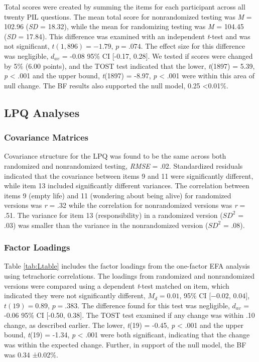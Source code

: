 \documentclass[english,man, mask]{apa6}
\theoremstyle{definition}
\theoremstyle{definition}
\theoremstyle{definition}
\theoremstyle{remark}
\begin{document}
Total scores were created by summing the items for each participant
across all twenty PIL questions. The mean total score for nonrandomized
testing was \emph{M} = 102.96 (\emph{SD} = 18.32), while the mean for
randomizing testing was \emph{M} = 104.45 (\emph{SD} = 17.84). This
difference was examined with an independent \emph{t}-test and was not
significant, \(t(1,896) = -1.79\), \(p = .074\). The effect size for
this difference was negligible, \(d_{av}\) = -0.08 95\% CI {[}-0.17,
0.28{]}. We tested if scores were changed by 5\% (6.00 points), and the
TOST test indicated that the lower, \emph{t}(1897) = 5.39, \emph{p}
\textless{} .001 and the upper bound, \emph{t}(1897) = -8.97, \emph{p}
\textless{} .001 were within this area of null change. The BF results
also supported the null model, 0.25 \textless{}0.01\%.

\subsection{LPQ Analyses}\label{lpq-analyses}

\subsubsection{Covariance Matrices}\label{covariance-matrices-1}

Covariance structure for the LPQ was found to be the same across both
randomized and nonrandomized testing, \emph{RMSE} = .02. Standardized
residuals indicated that the covariance between items 9 and 11 were
significantly different, while item 13 included significantly different
variances. The correlation between items 9 (empty life) and 11
(wondering about being alive) for randomized versions was \emph{r} = .32
while the correlation for nonrandomized versions was \emph{r} = .51. The
variance for item 13 (responsibility) in a randomized version (\(SD^2\)
= .03) was smaller than the variance in the nonrandomized version
(\(SD^2\) = .08).

\subsubsection{Factor Loadings}\label{factor-loadings-1}

Table \ref{tab:Ltable} includes the factor loadings from the one-factor
EFA analysis using tetrachoric correlations. The loadings from
randomized and nonrandomized versions were compared using a dependent
\emph{t}-test matched on item, which indicated they were not
significantly different, \(M_d = 0.01\), 95\% CI \([-0.02\), \(0.04]\),
\(t(19) = 0.89\), \(p = .383\). The difference found for this test was
negligible, \(d_{av}\) = -0.06 95\% CI {[}-0.50, 0.38{]}. The TOST test
examined if any change was within .10 change, as described earlier. The
lower, \emph{t}(19) = -0.45, \emph{p} \textless{} .001 and the upper
bound, \emph{t}(19) = -1.34, \emph{p} \textless{} .001 were both
significant, indicating that the change was within the expected change.
Further, in support of the null model, the BF was 0.34 ±0.02\%.
\end{document}
